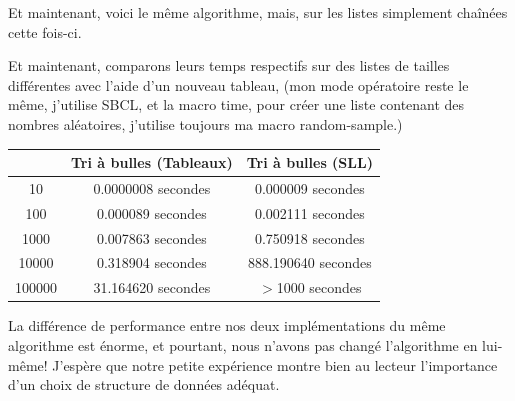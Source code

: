 \documentclass[a4paper, 12pt]{article}
\numberwithin{equation}{subsection}
\begin{document}
Et maintenant, voici le même algorithme, mais, sur les listes simplement chaînées cette fois-ci.

Et maintenant, comparons leurs temps respectifs sur des listes de tailles différentes avec l'aide d'un nouveau tableau, (mon mode opératoire reste le même, j'utilise SBCL, et la macro time, pour créer une liste contenant des nombres aléatoires, j'utilise toujours ma macro random-sample.)
\begin{table}[H]
  \centering
  \begin{tabular}{|c|c|c|}
    \hline & Tri à bulles (Tableaux) & Tri à bulles (SLL) \\
    \hline 10 &  0.0000008 secondes &  0.000009 secondes \\
    \hline 100 &  0.000089 secondes &  0.002111 secondes \\
    \hline 1000 & 0.007863 secondes &  0.750918 secondes \\
    \hline 10000 & 0.318904 secondes & 888.190640 secondes \\
    \hline 100000 &  31.164620 secondes & $>$1000 secondes \\
    \hline
  \end{tabular}
\end{table}
La différence de performance entre nos deux implémentations du même algorithme est énorme, et pourtant, nous n'avons pas changé l'algorithme en lui-même! J'espère que notre petite expérience montre bien au lecteur l'importance d'un choix de structure de données adéquat.
\end{document}
